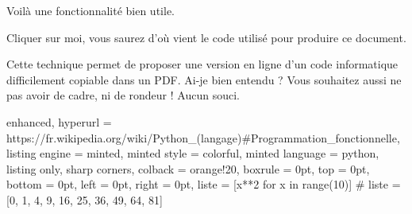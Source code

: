 \documentclass[varwidth, border = 3pt]{standalone}
\begin{document}
Voilà une fonctionnalité bien utile.

%
%
%
%
%
\begin{tcolorbox}[
  enhanced,
  title    = Une boîte pointant vers l'extérieur,
  hyperurl = https://www.latex-project.org/news/2023/03/17/TLC3/,
]
  Cliquer sur moi, vous saurez d'où vient le code utilisé pour produire ce document.
\end{tcolorbox}


Cette technique permet de proposer une version en ligne d'un code informatique difficilement copiable dans un PDF. Ai-je bien entendu ? Vous souhaitez aussi ne pas avoir de cadre, ni de rondeur ! Aucun souci.

\begin{tcblisting}{
  enhanced,
  hyperurl = https://fr.wikipedia.org/wiki/Python_(langage)\#Programmation_fonctionnelle,
  listing engine  = minted,
  minted style    = colorful,
  minted language = python,
  listing only,
  sharp corners,
  colback  = orange!20,
  boxrule  = 0pt,
  top      = 0pt,
  bottom   = 0pt,
  left     = 0pt,
  right    = 0pt,
}
liste = [x**2 for x in range(10)]
# liste = [0, 1, 4, 9, 16, 25, 36, 49, 64, 81]
\end{tcblisting}
\end{document}
